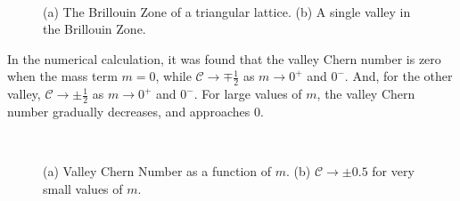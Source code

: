 \documentclass{report}
\begin{document}
\begin{figure}[h!]
	\centering
	\caption{(a) The Brillouin Zone of a triangular lattice. (b) A single valley in the Brillouin Zone.
	}~\label{Fig:BZ}
\end{figure}

In the numerical calculation, it was found that the valley Chern number is zero when the mass term $m = 0$, while $\mathcal{C} \rightarrow \mp \frac{1}{2}$ as $m \rightarrow 0^+$ and $0^-$. And, for the other valley, $\mathcal{C} \rightarrow \pm \frac{1}{2}$ as $m \rightarrow 0^+$ and $0^-$. For large values of $m$, the valley Chern number gradually decreases, and approaches $0$.

\begin{figure}[h!]
	\centering
	\caption{(a) Valley Chern Number as a function of $m$. (b) $\mathcal{C} \rightarrow \pm 0.5$ for very small values of $m$.
	}~\label{Fig:inner_products}
\end{figure}
\end{document}
